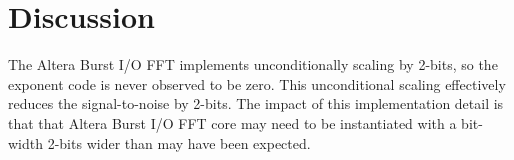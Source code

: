 \section{Discussion}
\label{sec:discussion}

The Altera Burst I/O FFT implements unconditionally scaling by 2-bits, so
the exponent code is never observed to be zero. This unconditional scaling
effectively reduces the signal-to-noise by 2-bits. The impact of this
implementation detail is that that Altera Burst I/O FFT core may need to
be instantiated with a bit-width 2-bits wider than may have been expected.